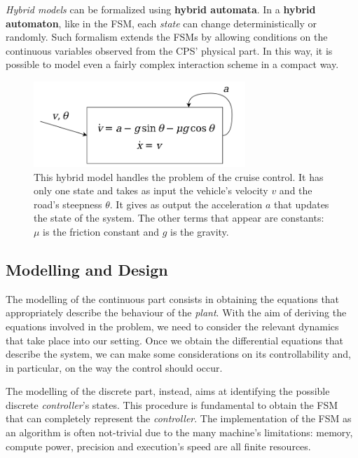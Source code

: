 \textit{Hybrid models} can be formalized using \textbf{hybrid automata}.
In a \textbf{hybrid automaton}, like in the FSM, each \textit{state} can change deterministically or randomly.
Such formalism extends the FSMs by allowing conditions on the continuous variables observed from the CPS' physical part. 
In this way, it is possible to model even a fairly complex interaction scheme in a compact way.

\begin{figure}[H]
	\centering
	\includegraphics[width=8cm, keepaspectratio]{img/2_1_hybridmod.png}
	\caption{This hybrid model handles the problem of the cruise control. It has only one state and takes as input the vehicle's velocity $v$ and the road's steepness $\theta$. It gives as output the acceleration $a$ that updates the state of the system. The other terms that appear are constants: $\mu$ is the friction constant and $g$ is the gravity.}
\end{figure}


\subsection{Modelling and Design}
The modelling of the continuous part consists in obtaining the equations that appropriately describe the behaviour of the \textit{plant}.
With the aim of deriving the equations involved in the problem, we need to consider the relevant dynamics that take place into our setting.
Once we obtain the differential equations that describe the system, we can make some considerations on its controllability and, in particular, on the way the control should occur.

The modelling of the discrete part, instead, aims at identifying the possible discrete \textit{controller}'s states.
This procedure is fundamental to obtain the FSM that can completely represent the \textit{controller}.
The implementation of the FSM as an algorithm is often not-trivial due to the many machine's limitations: memory, compute power, precision and execution's speed are all finite resources.

